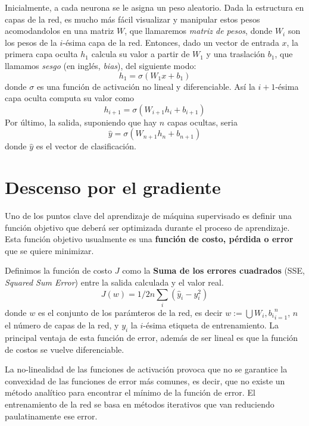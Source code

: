 Inicialmente, a cada neurona se le asigna un peso aleatorio. Dada la
estructura en capas de la red, es mucho más fácil visualizar y
manipular estos pesos acomodandolos en una matriz $W$, que llamaremos
\textit{matriz de pesos}, donde $W_i$ son los pesos de la $i$-ésima
capa de la red. Entonces, dado un vector de entrada $x$, la primera
capa oculta $h_1$ calcula su valor a partir de $W_1$ y una traslación
$b_1$, que llamamos \textit{sesgo} (en inglés, \textit{bias}), del
siguiente modo:
\begin{equation}
  h_1 = \sigma(W_1x + b_1)
\end{equation}
donde $\sigma$ es una función de activación no lineal y
diferenciable. Así la $i+1$-ésima capa oculta computa su valor como
\begin{equation}
  h_{i+1} = \sigma(W_{i+1}h_i + b_{i+1})
\end{equation}
Por último, la salida, suponiendo que hay $n$ capas ocultas, seria
\begin{equation}
  \hat{y} = \sigma{(W_{n+1}h_n + b_{n+1})}
\end{equation}
donde $\hat{y}$ es el vector de clasificación.

\section{Descenso por el gradiente}
Uno de los puntos clave del aprendizaje de máquina supervisado es
definir una función objetivo que deberá ser optimizada durante el
proceso de aprendizaje. Esta función objetivo usualmente es una
\textbf{función de costo, pérdida o error} que se quiere minimizar.

Definimos la función de costo $J$ como la \textbf{Suma de los errores
  cuadrados} (SSE, \textit{Squared Sum Error}) entre la salida
  calculada y el valor real.
\begin{equation}
  J(w)=1/2n \sum_i (\hat{y}_i - y_i^2)
\end{equation}
donde $w$ es el conjunto de los parámteros de la red, es decir $w :=
\bigcup{W_i, b_i}_{i=1}^{n}$, $n$ el número de capas de la red, y
$y_i$ la $i$-ésima etiqueta de entrenamiento. La principal ventaja de
esta función de error, además de ser lineal es que la función de
costos se vuelve diferenciable.

La no-linealidad de las funciones de activación provoca que no se
garantice la convexidad de las funciones de error más comunes, es
decir, que no existe un método analítico para encontrar el mínimo de
la función de error. El entrenamiento de la red se basa en métodos
iterativos que van reduciendo paulatinamente ese error.

